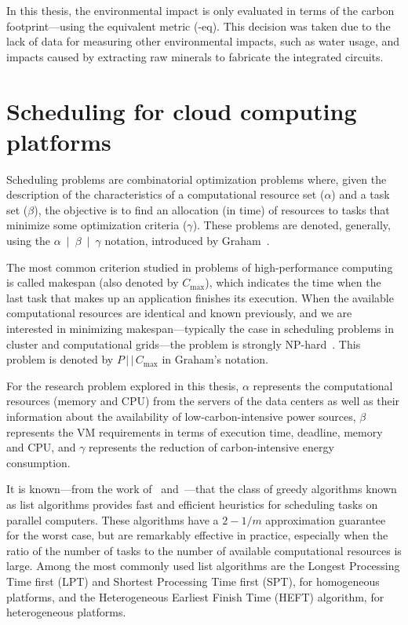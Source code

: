 In this thesis, the environmental impact is only evaluated in terms of the carbon footprint---using the  equivalent metric (-eq). This decision was taken due to the lack of data for measuring other environmental impacts, such as water usage, and impacts caused by extracting raw minerals to fabricate the integrated circuits.

\section{Scheduling for cloud computing platforms}
\label{sec:scheduling_cloud}

Scheduling problems are combinatorial optimization problems where, given the description of the characteristics of a computational resource set ($\alpha$) and a task set ($\beta$), the objective is to find an allocation (in time) of resources to tasks that minimize some optimization criteria ($\gamma$). These problems are denoted, generally, using the \mbox{$\alpha$ $\vert$ $\beta$ $\vert$ $\gamma$} notation, introduced by Graham~\citep{graham}. 

The most common criterion studied in problems of high-performance computing is called makespan (also denoted by $C_{\max}$), which indicates the time when the last task that makes up an application finishes its execution. When the available computational resources are identical and known previously, and we are interested in minimizing makespan---typically the case in scheduling problems in cluster and computational grids---the problem is strongly NP-hard~\citep{Garey}. This problem is denoted by $P\,\vert\,\vert\,C_{\max}$ in Graham's notation.

For the research problem explored in this thesis, $\alpha$ represents the computational resources (memory and CPU) from the servers of the data centers as well as their information about the availability of low-carbon-intensive power sources, $\beta$ represents the VM requirements in terms of execution time,  deadline, memory and CPU, and $\gamma$ represents the reduction of carbon-intensive energy consumption.

It is known---from the work of~\citet {graham} and~\citet {Garey}---that the class of greedy algorithms known as list algorithms provides fast and efficient heuristics for scheduling tasks on parallel computers. These algorithms have a $2 -1 /m$ approximation guarantee for the worst case, but are remarkably effective in practice, especially when the ratio of the number of tasks to the number of available computational resources is large. Among the most commonly used list algorithms are the Longest Processing Time first (LPT) and Shortest Processing Time first (SPT),  for homogeneous platforms, and the Heterogeneous Earliest Finish Time (HEFT) algorithm, for heterogeneous platforms.

